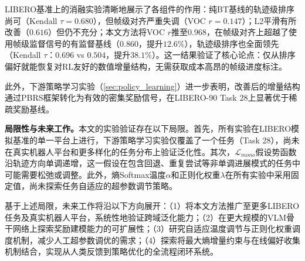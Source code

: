LIBERO基准上的消融实验清晰地展示了各组件的作用：纯BT基线的轨迹级排序尚可（Kendall $\tau = 0.680$），但帧级对齐严重失调（VOC $r = 0.147$）；L2平滑有所改善（$0.616$）但仍不充分；本文方法将VOC $r$推至$0.968$，在帧级对齐上超越了使用帧级监督信号的有监督基线（$0.860$，提升$12.6\%$），轨迹级排序也全面领先（Kendall $\tau$：$0.696$ vs $0.504$，提升$38.1\%$）。这一结果验证了核心论点：仅从排序偏好就能恢复对RL友好的数值增量结构，无需获取成本高昂的帧级进度标注。

此外，下游策略学习实验（\cref{sec:policy_learning}）进一步表明，改善后的增量结构通过PBRS框架转化为有效的密集奖励信号，在LIBERO-90 Task 28上显著优于稀疏奖励基线。

\textbf{局限性与未来工作。}本文的实验验证存在以下局限。首先，所有实验在LIBERO模拟基准的单一平台上进行，下游策略学习实验仅覆盖了一个任务（Task 28），尚未在真实机器人平台和更多样化的任务分布上验证泛化性。其次，$\mathcal{L}_{mono}$假设势函数沿轨迹方向单调递增，这一假设在包含回退、重复尝试等非单调进展模式的任务中可能需要松弛或调整。此外，熵Softmax温度$\alpha$和正则化权重$\lambda$在所有实验中采用固定值，尚未探索任务自适应的超参数调节策略。

基于上述局限，未来工作将沿以下方向展开：（1）将本文方法推广至更多LIBERO任务及真实机器人平台，系统性地验证跨域泛化能力；（2）在更大规模的VLM骨干网络上探索奖励建模能力的可扩展性；（3）研究自适应温度调节与正则化权重调度机制，减少人工超参数调优的需求；（4）探索将最大熵增量约束与在线偏好收集机制结合，实现从人类反馈到策略优化的全流程闭环系统。



